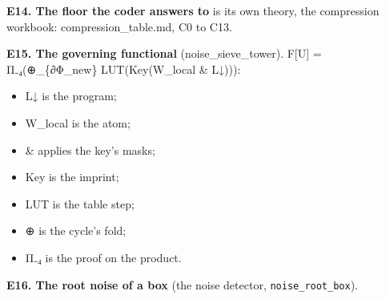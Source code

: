 \textbf{E14. The floor the coder answers to} is its own theory, the compression workbook: compression\_\allowbreak{}table.md, C0 to C13.

\textbf{E15. The governing functional} (noise\_\allowbreak{}sieve\_\allowbreak{}tower). F[U] = Π₋₄(⊕\_\allowbreak{}\{∂Φ\_\allowbreak{}new\} LUT(Key(W\_\allowbreak{}local \& L↓))):

\begin{itemize}
\item L↓ is the program;
\item W\_\allowbreak{}local is the atom;
\item \& applies the key's masks;
\item Key is the imprint;
\item LUT is the table step;
\item ⊕ is the cycle's fold;
\item Π₋₄ is the proof on the product.
\end{itemize}

\textbf{E16. The root noise of a box} (the noise detector, \texttt{noise\_\allowbreak{}root\_\allowbreak{}box}).

